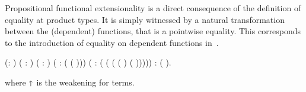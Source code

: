 
\begin{coqdoccode}
\coqdocemptyline
\coqdocemptyline
\end{coqdoccode}


  Propositional functional extensionality is a direct consequence of the definition
  of equality at product types. It is simply witnessed by a natural transformation
  between the (dependent) functions, that is a pointwise equality. This corresponds 
  to the introduction of equality on dependent functions in~\cite{DBLP:conf/popl/LicataH12}.
\begin{coqdoccode}
\coqdocemptyline
\coqdocemptyline
\coqdocnoindent
{}  (: ) ( :  )\coqdoceol
\coqdocindent{5.50em}
( :  ) (  :  ( (\coqdocdefinition{$\Lambda$} )))\coqdoceol
\coqdocindent{5.50em}
( :  ( (\coqdocdefinition{$\Lambda$} ( (\coqdocnotation{$\shortuparrow$}  \coqdocnotation{$\star$}  ) (\coqdocnotation{$\shortuparrow$}  \coqdocnotation{$\star$}  )))))\coqdoceol
\coqdocnoindent
:  (  ).\coqdoceol
\coqdocemptyline
\end{coqdoccode}
 \noindent where $\shortuparrow$ is the weakening for terms. 
\begin{coqdoccode}
\end{coqdoccode}
